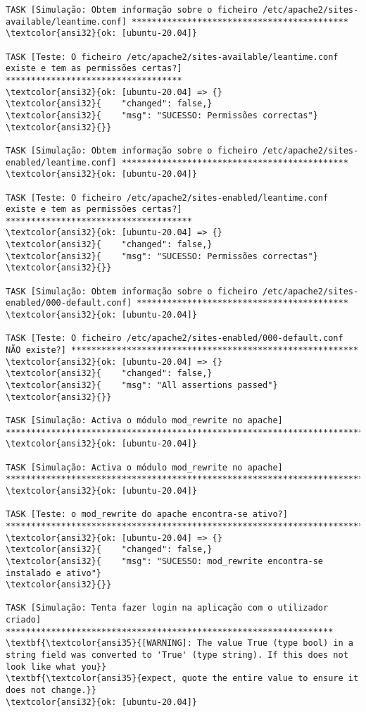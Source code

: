 \documentclass{scrartcl}
\begin{document}
\begin{Verbatim}
TASK [Simulação: Obtem informação sobre o ficheiro /etc/apache2/sites-available/leantime.conf] *******************************************
\textcolor{ansi32}{ok: [ubuntu-20.04]}

TASK [Teste: O ficheiro /etc/apache2/sites-available/leantime.conf existe e tem as permissões certas?] ***********************************
\textcolor{ansi32}{ok: [ubuntu-20.04] => {}
\textcolor{ansi32}{    "changed": false,}
\textcolor{ansi32}{    "msg": "SUCESSO: Permissões correctas"}
\textcolor{ansi32}{}}

TASK [Simulação: Obtem informação sobre o ficheiro /etc/apache2/sites-enabled/leantime.conf] *********************************************
\textcolor{ansi32}{ok: [ubuntu-20.04]}

TASK [Teste: O ficheiro /etc/apache2/sites-enabled/leantime.conf existe e tem as permissões certas?] *************************************
\textcolor{ansi32}{ok: [ubuntu-20.04] => {}
\textcolor{ansi32}{    "changed": false,}
\textcolor{ansi32}{    "msg": "SUCESSO: Permissões correctas"}
\textcolor{ansi32}{}}

TASK [Simulação: Obtem informação sobre o ficheiro /etc/apache2/sites-enabled/000-default.conf] ******************************************
\textcolor{ansi32}{ok: [ubuntu-20.04]}

TASK [Teste: O ficheiro /etc/apache2/sites-enabled/000-default.conf NÃO existe?] *********************************************************
\textcolor{ansi32}{ok: [ubuntu-20.04] => {}
\textcolor{ansi32}{    "changed": false,}
\textcolor{ansi32}{    "msg": "All assertions passed"}
\textcolor{ansi32}{}}

TASK [Simulação: Activa o módulo mod_rewrite no apache] **********************************************************************************
\textcolor{ansi32}{ok: [ubuntu-20.04]}

TASK [Simulação: Activa o módulo mod_rewrite no apache] **********************************************************************************
\textcolor{ansi32}{ok: [ubuntu-20.04]}

TASK [Teste: o mod_rewrite do apache encontra-se ativo?] *********************************************************************************
\textcolor{ansi32}{ok: [ubuntu-20.04] => {}
\textcolor{ansi32}{    "changed": false,}
\textcolor{ansi32}{    "msg": "SUCESSO: mod_rewrite encontra-se instalado e ativo"}
\textcolor{ansi32}{}}

TASK [Simulação: Tenta fazer login na aplicação com o utilizador criado] *****************************************************************
\textbf{\textcolor{ansi35}{[WARNING]: The value True (type bool) in a string field was converted to 'True' (type string). If this does not look like what you}}
\textbf{\textcolor{ansi35}{expect, quote the entire value to ensure it does not change.}}
\textcolor{ansi32}{ok: [ubuntu-20.04]}


\end{Verbatim}
\end{document}
